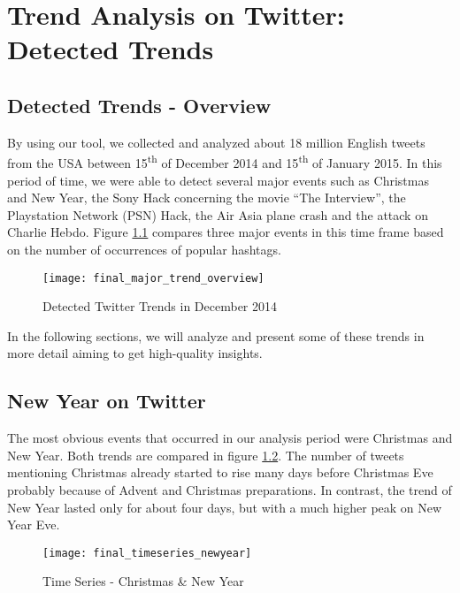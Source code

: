 \chapter{Trend Analysis on Twitter: Detected Trends}
\label{cha:trend-stories}

\section{Detected Trends - Overview}
\label{sec:trend-overview}

By using our tool, we collected and analyzed about 18 million English tweets from the USA between 15\textsuperscript{th} of December 2014 and 15\textsuperscript{th} of January 2015. In this period of time, we were able to detect several major events such as Christmas and New Year, the Sony Hack concerning the movie \enquote{The Interview}, the Playstation Network (PSN) Hack, the Air Asia plane crash and the attack on Charlie Hebdo. Figure \ref{fig:major-trend-overview} compares three major events in this time frame based on the number of occurrences of popular hashtags. 

\begin{figure}[H]
  \centering
        \texttt{[image: final\_major\_trend\_overview]}
  \caption[Detected Twitter Trends in December 2014]{Detected Twitter Trends in December 2014}
  \label{fig:major-trend-overview}
\end{figure}

In the following sections, we will analyze and present some of these trends in more detail aiming to get high-quality insights. 

\section{New Year on Twitter}
\label{sec:happy-new-year}
The most obvious events that occurred in our analysis period were Christmas and New Year. Both trends are compared in figure \ref{fig:christmas-new-year-time-series}. The number of tweets mentioning Christmas already started to rise many days before Christmas Eve probably because of Advent and Christmas preparations. In contrast, the trend of New Year lasted only for about four days, but with a much higher peak on New Year Eve.

\begin{figure}[H]
  \centering
        \texttt{[image: final\_timeseries\_newyear]}
  \caption[Time Series - Christmas \& New Year ]{Time Series - Christmas \& New Year}
  \label{fig:christmas-new-year-time-series}
  \vspace{-1.3em}
\end{figure}

